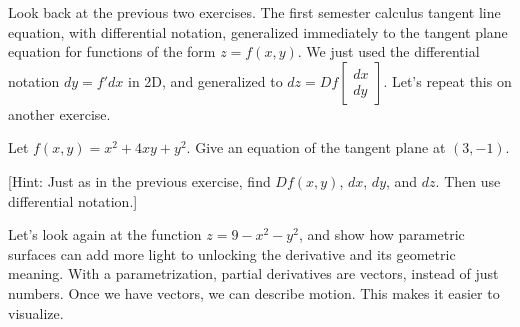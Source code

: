 Look back at the previous two exercises.  The first semester calculus tangent line equation, with differential notation, generalized immediately to the tangent plane equation for functions of the form $z=f(x,y)$. 
We just used the differential notation $dy=f'dx$ in 2D, and generalized to $dz = Df \begin{bmatrix}dx\\dy\end{bmatrix}$. Let's repeat this on another exercise.

\begin{challenge}
%
%
 Let $f(x,y)=x^2+4xy+y^2$. Give an equation of the tangent plane at $(3,-1)$. 

 [Hint: Just as in the previous exercise, find $Df(x,y)$, $dx$, $dy$, and $dz$.  Then use differential notation.]
\end{challenge}

Let's look again at the function $z=9-x^2-y^2$, and show how parametric surfaces can add more light to unlocking the derivative and its geometric meaning. With a parametrization, partial derivatives are vectors, instead of just numbers.  Once we have vectors, we can describe motion. This makes it easier to visualize.

